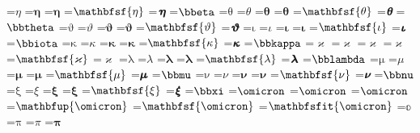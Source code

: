 \documentclass{article}
\begin{document}
=\hbox{$\mathit{\eta}$}
=\hbox{$\mathbf{\eta}$}
=\hbox{$\mathbfup{\eta}$}
=\hbox{$\mathbfsf{\eta}$}
=\hbox{$\mathbfsfit{\eta}$}
=\hbox{$\bbeta $}
=\hbox{$\mathrm{\theta}$}
=\hbox{$\mathit{\theta}$}
=\hbox{$\mathbf{\theta}$}
=\hbox{$\mathbfup{\theta}$}
=\hbox{$\mathbfsf{\theta}$}
=\hbox{$\mathbfsfit{\theta}$}
=\hbox{$\bbtheta $}
=\hbox{$\mathrm{\vartheta}$}
=\hbox{$\mathit{\vartheta}$}
=\hbox{$\mathbf{\vartheta}$}
=\hbox{$\mathbfup{\vartheta}$}
=\hbox{$\mathbfsf{\vartheta}$}
=\hbox{$\mathbfsfit{\vartheta}$}
=\hbox{$\mathrm{\iota}$}
=\hbox{$\mathit{\iota}$}
=\hbox{$\mathbf{\iota}$}
=\hbox{$\mathbfup{\iota}$}
=\hbox{$\mathbfsf{\iota}$}
=\hbox{$\mathbfsfit{\iota}$}
=\hbox{$\bbiota $}
=\hbox{$\mathrm{\kappa}$}
=\hbox{$\mathit{\kappa}$}
=\hbox{$\mathbf{\kappa}$}
=\hbox{$\mathbfup{\kappa}$}
=\hbox{$\mathbfsf{\kappa}$}
=\hbox{$\mathbfsfit{\kappa}$}
=\hbox{$\bbkappa $}
=\hbox{$\mathrm{\varkappa}$}
=\hbox{$\mathit{\varkappa}$}
=\hbox{$\mathbf{\varkappa}$}
=\hbox{$\mathbfup{\varkappa}$}
=\hbox{$\mathbfsf{\varkappa}$}
=\hbox{$\mathbfsfit{\varkappa}$}
=\hbox{$\mathrm{\lambda}$}
=\hbox{$\mathit{\lambda}$}
=\hbox{$\mathbf{\lambda}$}
=\hbox{$\mathbfup{\lambda}$}
=\hbox{$\mathbfsf{\lambda}$}
=\hbox{$\mathbfsfit{\lambda}$}
=\hbox{$\bblambda $}
=\hbox{$\mathrm{\mu}$}
=\hbox{$\mathit{\mu}$}
=\hbox{$\mathbf{\mu}$}
=\hbox{$\mathbfup{\mu}$}
=\hbox{$\mathbfsf{\mu}$}
=\hbox{$\mathbfsfit{\mu}$}
=\hbox{$\bbmu $}
=\hbox{$\mathrm{\nu}$}
=\hbox{$\mathit{\nu}$}
=\hbox{$\mathbf{\nu}$}
=\hbox{$\mathbfup{\nu}$}
=\hbox{$\mathbfsf{\nu}$}
=\hbox{$\mathbfsfit{\nu}$}
=\hbox{$\bbnu $}
=\hbox{$\mathrm{\xi}$}
=\hbox{$\mathit{\xi}$}
=\hbox{$\mathbf{\xi}$}
=\hbox{$\mathbfup{\xi}$}
=\hbox{$\mathbfsf{\xi}$}
=\hbox{$\mathbfsfit{\xi}$}
=\hbox{$\bbxi $}
=\hbox{$\mathrm{\omicron}$}
=\hbox{$\mathit{\omicron}$}
=\hbox{$\mathbf{\omicron}$}
=\hbox{$\mathbfup{\omicron}$}
=\hbox{$\mathbfsf{\omicron}$}
=\hbox{$\mathbfsfit{\omicron}$}
=\hbox{$\mathbb{o}$}
=\hbox{$\mathrm{\pi}$}
=\hbox{$\mathit{\pi}$}
=\hbox{$\mathbf{\pi}$}
\end{document}
